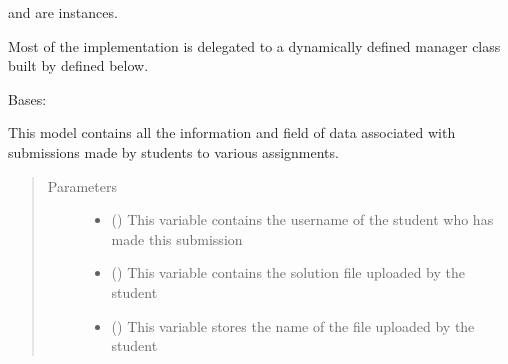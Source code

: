 \documentclass[letterpaper,10pt,english]{sphinxmanual}
\begin{document}
\begin{fulllineitems}
\begin{fulllineitems}
\sphinxAtStartPar
{} and  are 
instances.

\sphinxAtStartPar
Most of the implementation is delegated to a dynamically defined manager
class built by  defined below.

\end{fulllineitems}


\end{fulllineitems}


\begin{fulllineitems}
\label{\detokenize{users:users.models.studentsubmissions}}
\sphinxAtStartPar
Bases: 

\sphinxAtStartPar
This model contains all the information and field of data associated with submissions made by students to various assignments.
\begin{quote}\begin{description}
\item[{Parameters}] \leavevmode\begin{itemize}
\item {} 
\sphinxAtStartPar
{} () \textendash{} This variable contains the username of the student who has made this submission

\item {} 
\sphinxAtStartPar
{} () \textendash{} This variable contains the solution file uploaded by the student

\item {} 
\sphinxAtStartPar
{} () \textendash{} This variable stores the name of the file uploaded by the student


\end{itemize}
\end{description}
\end{quote}
\end{fulllineitems}
\end{document}
